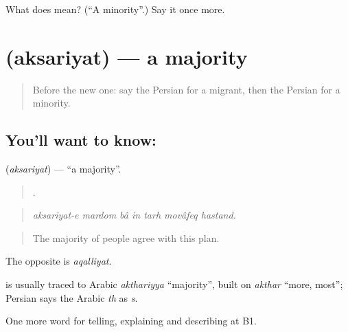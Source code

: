 \begin{tcolorbox}[breakable,colback=teal!4,colframe=teal!35!black,title={Before you move on}]
What does  mean? (\textquotedblleft{}A minority\textquotedblright{}.) Say it once more.
\end{tcolorbox}
\section[\texorpdfstring{\fa{اکثریت} (aksariyat)}{اکثریت (aksariyat)}]{ (aksariyat) — a majority}

\label{lesson:FA-C387-aksariyyat}



\begin{quote}
Before the new one: say the Persian for a migrant, then the Persian for a minority.
\end{quote}

\subsection*{You'll want to know: }
\textbf{} (\emph{aksariyat}) — \textquotedblleft{}a majority\textquotedblright{}.

\begin{quote}
      .
\end{quote}

\begin{quote}
\emph{aksariyat-e mardom bâ in tarh movâfeq hastand.}
\end{quote}

\begin{quote}
The majority of people agree with this plan.
\end{quote}

The opposite is \emph{aqalliyat}.

\begin{cousinweb}
\textbf{} is usually traced to Arabic \emph{akthariyya} \textquotedblleft{}majority\textquotedblright{}, built on \emph{akthar} \textquotedblleft{}more, most\textquotedblright{}; Persian says the Arabic \emph{th} as \emph{s}.
\end{cousinweb}

\begin{grammarlens}[title={What you've built}]
One more word for telling, explaining and describing at B1.
\end{grammarlens}

